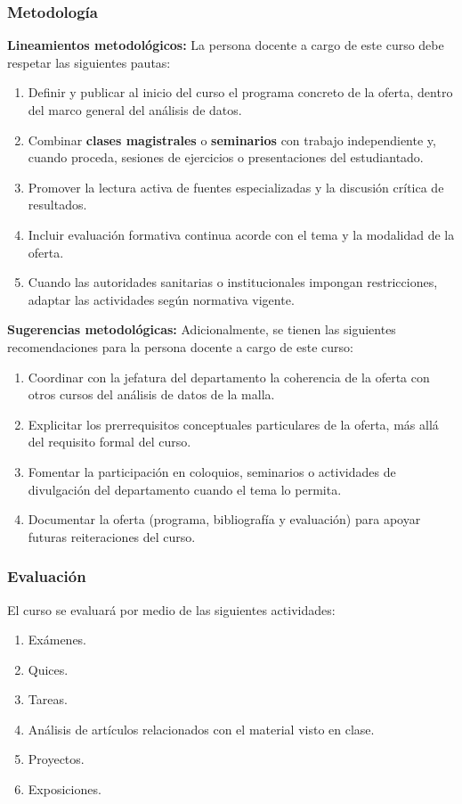 \begin{refsection}
\subsubsection*{Metodología}

\noindent \textbf{Lineamientos metodológicos:} La persona docente a cargo de este curso debe respetar las siguientes pautas:

\begin{enumerate}
    \item Definir y publicar al inicio del curso el programa concreto de la oferta, dentro del marco general del análisis de datos.
    \item Combinar \textbf{clases magistrales} o \textbf{seminarios} con trabajo independiente y, cuando proceda, sesiones de ejercicios o presentaciones del estudiantado.
    \item Promover la lectura activa de fuentes especializadas y la discusión crítica de resultados.
    \item Incluir evaluación formativa continua acorde con el tema y la modalidad de la oferta.
    \item Cuando las autoridades sanitarias o institucionales impongan restricciones, adaptar las actividades según normativa vigente.
\end{enumerate}

\textbf{Sugerencias metodológicas:} Adicionalmente, se tienen las siguientes recomendaciones para la persona docente a cargo de este curso:

\begin{enumerate}
    \item Coordinar con la jefatura del departamento la coherencia de la oferta con otros cursos del análisis de datos de la malla.
    \item Explicitar los prerrequisitos conceptuales particulares de la oferta, más allá del requisito formal del curso.
    \item Fomentar la participación en coloquios, seminarios o actividades de divulgación del departamento cuando el tema lo permita.
    \item Documentar la oferta (programa, bibliografía y evaluación) para apoyar futuras reiteraciones del curso.
\end{enumerate}

\subsubsection*{Evaluación}

El curso se evaluará por medio de las siguientes actividades:

\begin{enumerate}
\item Exámenes.
\item Quices.
\item Tareas.
\item Análisis de artículos relacionados con el material visto en clase.
\item Proyectos.
\item Exposiciones.
\end{enumerate}

\end{refsection}
